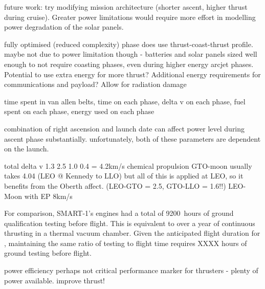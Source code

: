 future work: try modifying mission architecture (shorter ascent, higher thrust during cruise). Greater power limitations would require more effort in modelling power degradation of the solar panels.


fully optimised (reduced complexity) phase does use thrust-coast-thrust profile. maybe not due to power limitation though - batteries and solar panels sized well enough to not require coasting phases, even during higher energy arcjet phases. Potential to use extra energy for more thrust? Additional energy requirements for communications and payload? Allow for radiation damage


time spent in van allen belts, time on each phase, delta v on each phase, fuel spent on each phase, energy used on each phase

combination of right ascension and launch date can affect power level during ascent phase substantially. unfortunately, both of these parameters are dependent on the launch.


total delta v 
1.3 2.5 1.0 0.4 = 4.2km/s
chemical propulsion GTO-moon usually takes 4.04 (LEO @ Kennedy to LLO) but all of this is applied at LEO, so it benefits from the Oberth affect. (LEO-GTO = 2.5, GTO-LLO = 1.6!!)
LEO-Moon with EP 8km/s


For comparison, SMART-1's engines had a total of 9200~hours of ground qualification testing before flight. This is equivalent to over a year of continuous thrusting in a thermal vacuum chamber. Given the anticipated flight duration for \BW, maintaining the same ratio of testing to flight time requires XXXX hours of ground testing before flight.


power efficiency perhaps not critical performance marker for thrusters - plenty of power available. improve thrust! 




